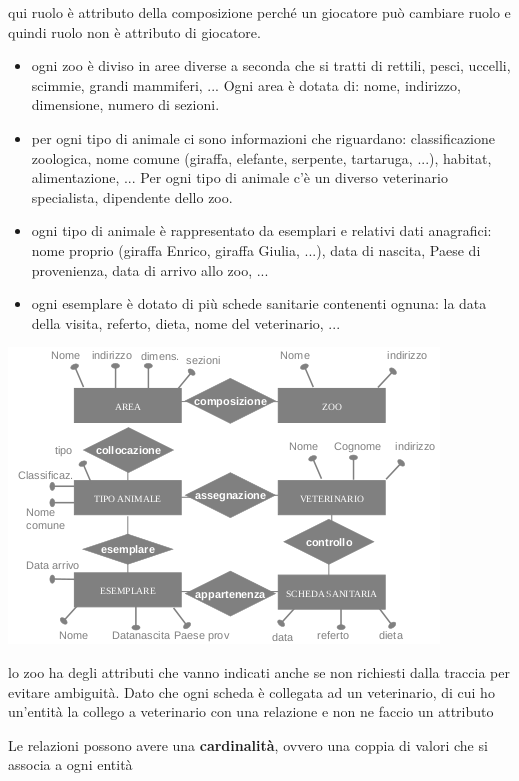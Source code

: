 \documentclass[a4paper,12pt, oneside]{book}
\begin{document}
qui ruolo è attributo della composizione perché un giocatore può cambiare ruolo e quindi ruolo non è attributo di giocatore.\\
\begin{esempio}
\begin{itemize}
\item ogni zoo è diviso in aree diverse a seconda che si tratti di rettili, pesci, uccelli, scimmie, grandi mammiferi, ... Ogni area è dotata di: nome,
indirizzo, dimensione, numero di sezioni.
\item per ogni tipo di animale ci sono informazioni che riguardano: classificazione zoologica, nome comune (giraffa, elefante, serpente,
tartaruga, ...), habitat, alimentazione, ... Per ogni tipo di animale c'è un diverso veterinario specialista, dipendente dello zoo.
\item ogni tipo di animale è rappresentato da esemplari e relativi dati anagrafici: nome proprio (giraffa Enrico, giraffa Giulia, ...), data di nascita,
Paese di provenienza, data di arrivo allo zoo, ...
\item ogni esemplare è dotato di più schede sanitarie contenenti ognuna: la data della visita, referto, dieta, nome del veterinario, ...

\end{itemize}
\begin{center}
\includegraphics[scale=0.8]{img/er3.png}
\end{center}
lo zoo ha degli attributi che vanno indicati anche se non richiesti dalla traccia per evitare ambiguità. Dato che ogni scheda è collegata ad un veterinario, di cui ho un'entità la collego a veterinario con una relazione e non ne faccio  un attributo
\end{esempio}
Le relazioni possono avere una \textbf{cardinalità}, ovvero una coppia di valori che si associa a ogni entità
\end{document}
